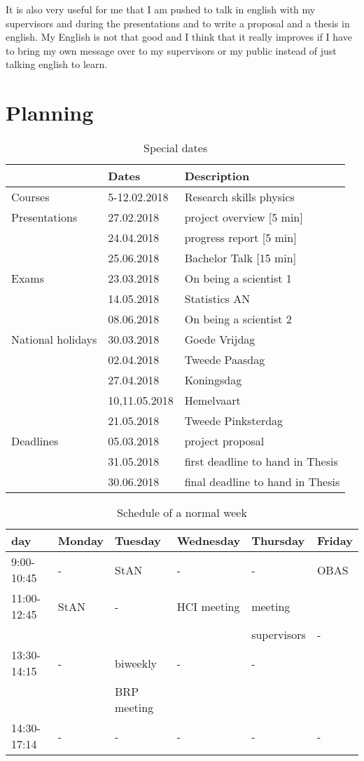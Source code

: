 \documentclass[twoside,single]{lion-msc}
\begin{document}
It is also very useful for me that I am pushed to talk in english with my supervisors and during the presentations and to write a proposal and a thesis in english. My English is not that good and I think that it really improves if I have to bring my own message over to my supervisors or my public instead of just talking english to learn.

\chapter{Planning}
\begin{table}[ht]
\centering
\caption{Special dates}
\begin{tabular}{l|l|l|}
						& \bf{Dates} 	& \bf{Description}\\\hline
Courses					& 5-12.02.2018	& Research skills physics\\
Presentations     		& 27.02.2018 	& project overview [5 min]\\
						& 24.04.2018	& progress report [5 min]\\
						& 25.06.2018	& Bachelor Talk [15 min]\\
Exams 					& 23.03.2018	& On being a scientist 1\\
						& 14.05.2018	& Statistics AN\\
						& 08.06.2018	& On being a scientist 2\\
National holidays		& 30.03.2018	& Goede Vrijdag\\
						& 02.04.2018	& Tweede Paasdag\\
						& 27.04.2018	& Koningsdag\\
						& 10,11.05.2018	& Hemelvaart\\
						& 21.05.2018	& Tweede Pinksterdag\\
Deadlines				& 05.03.2018	& project proposal \\
						& 31.05.2018	& first deadline to hand in Thesis\\
						& 30.06.2018	& final deadline to hand in Thesis\\\hline
\end{tabular}
\end{table}

\begin{table}[ht]
\centering
\caption{Schedule of a normal week}
\begin{tabular}{l|l|l|l|l|l|}
day 		&\bf{Monday}& \bf{Tuesday}			& \bf{Wednesday}& \bf{Thursday} & \bf{Friday}\\
\hline
9:00-10:45	& -			& StAN 					& -				& -				& OBAS \\
\hline
11:00-12:45	& StAN 		& -						& HCI meeting	& meeting &\\
&&&&supervisors				& -\\
\hline
13:30-14:15 & -			& biweekly &- &-& \\
&&BRP meeting	&				& 		& \\\hline
14:30-17:14 & - 		& - 					& - 			& - 			& - \\
\hline

\end{tabular}
\end{table}
\end{document}
